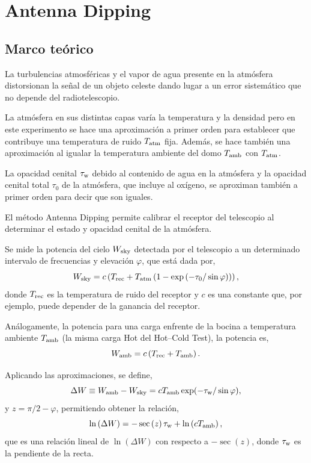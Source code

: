 \section{Antenna Dipping}\label{sec:antennadipping}

\subsection{Marco teórico}

La turbulencias atmosféricas y el vapor de agua presente en la atmósfera distorsionan la señal de un objeto celeste dando lugar a un error sistemático que no depende del radiotelescopio.

La atmósfera en sus distintas capas varía la temperatura y la densidad pero en este experimento se hace una aproximación a primer orden para establecer que contribuye una temperatura de ruido $T_\textnormal{atm}$ fija. Además, se hace también una aproximación al igualar la temperatura ambiente del domo $T_\textnormal{amb}$ con $T_\textnormal{atm}$.

La opacidad cenital $\tau_\textnormal{w}$ debido al contenido de agua en la atmósfera y la opacidad cenital total $\tau_0$ de la atmósfera, que incluye al oxígeno, se aproximan también a primer orden para decir que son iguales.

El método Antenna Dipping permite calibrar el receptor del telescopio al determinar el estado y opacidad cenital de la atmósfera.

Se mide la potencia del cielo $W_\textnormal{sky}$ detectada por el telescopio a un determinado intervalo de frecuencias y elevación $\varphi$, que está dada por,
\begin{equation}
W_\textnormal{sky}=c\left(T_\textnormal{rec}+T_\textnormal{atm}\left(1-\exp\left(-\tau_\textnormal{0}/\sin\varphi\right)\right)\right)
,\end{equation}
donde $T_\textnormal{rec}$ es la temperatura de ruido del receptor y $c$ es una constante que, por ejemplo, puede depender de la ganancia del receptor.

Análogamente, la potencia para una carga enfrente de la bocina a temperatura ambiente $T_\textnormal{amb}$ (la misma carga Hot del Hot--Cold Test), la potencia es,
\begin{equation}
W_\textnormal{amb}=c\left(T_\textnormal{rec}+T_\textnormal{amb}\right)
.\end{equation}

Aplicando las aproximaciones, se define,
\begin{equation}
\Delta W\equiv W_\textnormal{amb}-W_\textnormal{sky}=cT_\textnormal{amb}\exp(-\tau_\textnormal{w}/\sin\varphi)\label{eq:deltaw}
,\end{equation}
y $z=\pi/2-\varphi$, permitiendo obtener la relación,
\begin{equation}
\ln\left(\Delta W\right)=-\sec\left(z\right)\tau_\textnormal{w}+\ln\left(cT_\textnormal{amb}\right)\label{eq:taufit}
,\end{equation}
que es una relación lineal de $\ln(\Delta W)$ con respecto a ${-\sec\left(z\right)}$, donde $\tau_\textnormal{w}$ es la pendiente de la recta.

